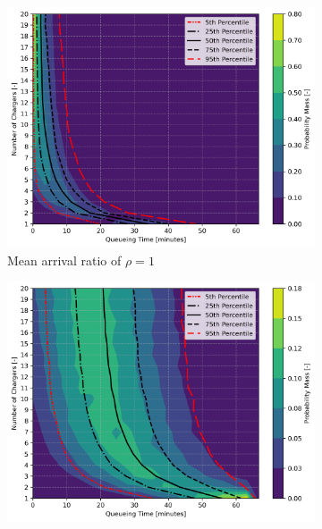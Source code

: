 \documentclass[11pt]{article}
\begin{document}


\begin{figure}[H]
	\centering
	
	\begin{subfigure}{.33\linewidth}
		\centering
		\includegraphics[width = \linewidth]{figs/expected_delay_contourf_1.png}
		\caption{Mean arrival ratio of $\rho = 1$}
	\end{subfigure}%
	\begin{subfigure}{.33\linewidth}
		\centering
		\includegraphics[width = \linewidth]{figs/expected_delay_contourf_2.png}

\end{subfigure}
\end{figure}
\end{document}
